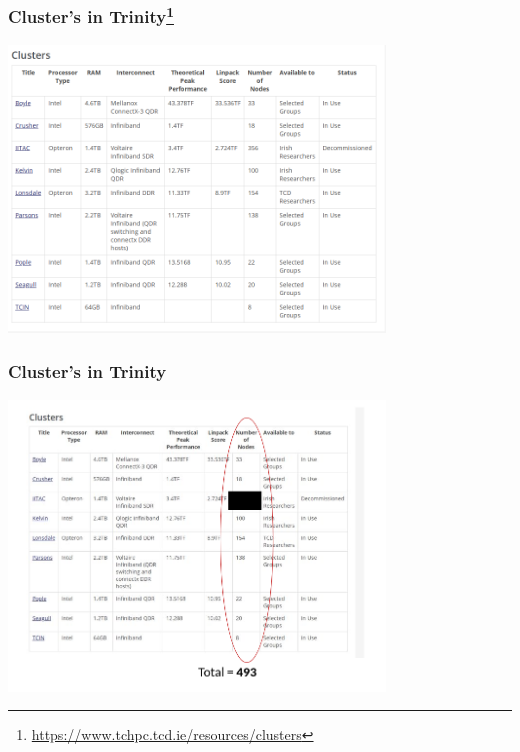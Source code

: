 \documentclass{beamer}
\begin{document}
\begin{frame}
\frametitle{Cluster's in Trinity\footnote{\url{https://www.tchpc.tcd.ie/resources/clusters}}}
\begin{center}
	\includegraphics[width=0.75\textwidth]{imgs/tchpc_clusters.png}
\end{center}
\end{frame}

\begin{frame}
\frametitle{Cluster's in Trinity}
\begin{center}
	\includegraphics[width=0.75\textwidth]{imgs/tchpc_clusters2.png}
\end{center}
\end{frame}
\end{document}
